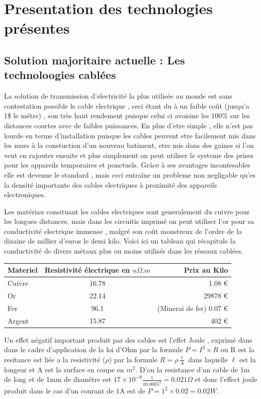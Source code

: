 \documentclass[11pt]{report}
\begin{document}
\section{Presentation des technologies présentes}
\subsection{Solution majoritaire actuelle : Les technoloogies cablées}
	La solution de transmission d'electricité la plus utilisée au monde est sans contestation possible le cable electrique , ceci étant du à un faible coût (jusqu'a 1\$ le métre) , son très haut rendement puisque celui ci avoisine les 100\% sur les distances courtes avec de faibles puissances. En plus d'etre simple , elle n'est pas lourde en terme d'installation puisque les cables peuvent etre facilement mis dans les murs à la constuction d'un nouveau batiment, etre mis dans des gaines si l'on veut en rajouter ensuite et plus simplement on peut utiliser le systeme des prises pour les appareils temporaires et ponctuels. Grâce à ses avantages incontesables elle est devenue le standard , mais ceci entraîne un probleme non negligable qu'es la densité importante des cables electriques à proximité des appareils electroniques.
	
	Les matériau consituant les cables electriques sont generalement du cuivre pour les longues distances, mais dans les circuitis imprimé on peut utiliser l'or pour sa conductivité electrique immense , malgré son coût monstreux de l'ordre de la dizaine de millier d'euros le demi kilo. Voici ici un tableau qui récapitule la conductivité de divers métaux plus ou moins utilisés dans les réseaux cablées.

\begin{center}
\begin{tabular}{| l | c | r |}
	\hline
	Materiel & Resistivité électrique en \( n\Omega .m \)& Prix au Kilo \\
	\hline
	Cuivre & 16.78 & 1.08 \euro{}  \\
	Or & 22.14 & 29878 \euro{}  \\
	Fer & 96.1 & (Minerai de fer) 0.07 \euro{}  \\
	Argent & 15.87 & 402 \euro{}  \\
	\hline
\end{tabular}
\end{center}

	Un effet négatif important produit par des cables est l'effet Joule , exprimé dans dans le cadre d'application de la loi d'Ohm par la formule \( P=I^{2} \times R\) ou R est la resitance est liée a la resistivité (\(\rho\)) par la formule \( R= \rho \frac{\ell}{A} \) dans laquelle \(\ell\) est la longeur et A est la surface en coupe en \(m^2\). D'ou la resistance d'un cable de 1m de long et de 1mm de diamétre est \(17 \times 10^{-9} \frac{1}{\pi 0.0005^{2}} = 0.021 \Omega \) et donc l'effect joule produit dans le cas d'un courant de 1A est de \( P=1^{2} \times 0.02 = 0.02 W\).
\end{document}

